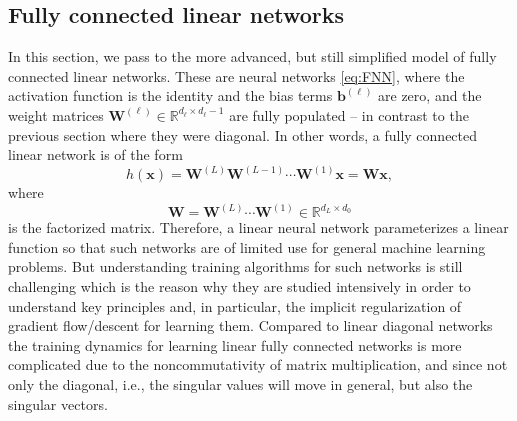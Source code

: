 \documentclass{svproc}
\newcommand{\bb}{\boldsymbol{b}}
\newcommand{\bW}{\boldsymbol{W}}
\newcommand{\bx}{\boldsymbol{x}}
\newcommand{\0}{\boldsymbol{0}}
\newcommand{\1}{\boldsymbol{1}}
\def\R{\mathbb{R}}
\begin{document}

\subsection{Fully connected linear networks}

In this section, we pass to the more advanced, but still simplified model of fully connected linear networks. These are neural networks \eqref{eq:FNN}, where the activation function is the identity and the bias terms $\bb^{(\ell)}$ are zero, and the weight matrices $\bW^{(\ell)} \in \R^{d_\ell \times d_{\ell}-1}$ are fully populated -- in contrast to the previous section where they were diagonal. In other words, a fully connected linear network is of the form
\[
h(\bx) = \bW^{(L)} \bW^{(L-1)} \cdots \bW^{(1)} \bx = \bW \bx,
\]
where 
\begin{equation}\label{lin-network}
\bW  = \bW^{(L)} \cdots \bW^{(1)} \in \R^{d_L \times d_0}
\end{equation}
is the factorized matrix. Therefore, a linear neural network parameterizes a linear function so that such networks are of limited use for general machine learning problems. But understanding training algorithms for such networks is still challenging which is the reason why they are studied intensively in order to understand key principles and, in particular, the implicit regularization of gradient flow/descent for learning them. Compared to linear diagonal networks the training dynamics for learning linear fully connected networks is more complicated due to the noncommutativity of matrix multiplication, and since not only the diagonal, i.e., the singular values will move in general, but also the singular vectors.

\medskip


\end{document}

